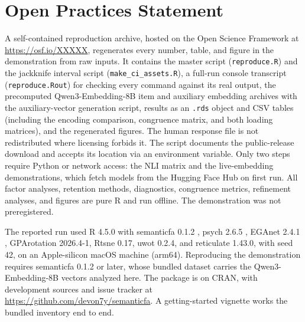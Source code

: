 \section{Open Practices Statement}

A self-contained reproduction archive, hosted on the Open Science Framework
at \url{https://osf.io/XXXXX}, regenerates every number, table, and figure in
the demonstration from raw inputs. It contains the master script
(\texttt{reproduce.R}) and the jackknife interval script
(\texttt{make\_ci\_assets.R}), a full-run console transcript (\texttt{reproduce.Rout})
for checking every command against its real output, the precomputed
Qwen3-Embedding-8B item and auxiliary embedding archives with the
auxiliary-vector generation script, results as an \texttt{.rds} object and CSV
tables (including the encoding comparison, congruence matrix, and both loading
matrices), and the regenerated figures. The human response file is not
redistributed where licensing forbids it. The script documents the public-release
download \citep{openpsychometrics-2018} and accepts its location via an
environment variable. Only two steps require Python or network access: the
NLI matrix and the live-embedding demonstrations, which fetch models from the
Hugging Face Hub on first run. All factor analyses, retention methods,
diagnostics, congruence metrics, refinement analyses, and figures are pure R
and run offline. The demonstration was not preregistered.

The reported run used R 4.5.0 \citep{rcoreteam-2025} with semanticfa 0.1.2 \citep{yanitski-westbury-2026}, psych 2.6.5 \citep{revelle-2026}, EGAnet 2.4.1 \citep{golino-christensen-2026}, GPArotation 2026.4-1, Rtsne 0.17, uwot 0.2.4, and reticulate 1.43.0, with seed 42, on an Apple-silicon macOS machine (arm64). Reproducing the demonstration requires semanticfa 0.1.2 or later, whose bundled dataset carries the Qwen3-Embedding-8B vectors analyzed here. The package is on CRAN, with development sources and issue tracker at \url{https://github.com/devon7y/semanticfa}. A getting-started vignette works the bundled inventory end to end.
